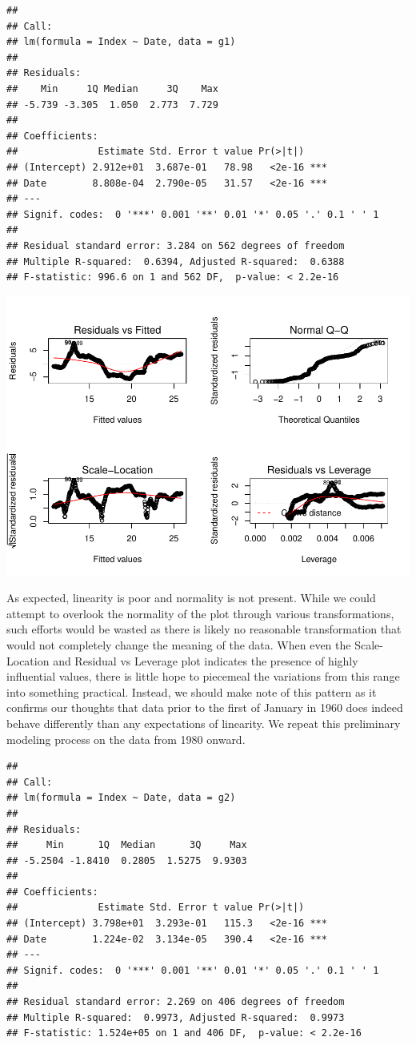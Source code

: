 \documentclass[
]{article}
\begin{document}
\begin{verbatim}
## 
## Call:
## lm(formula = Index ~ Date, data = g1)
## 
## Residuals:
##    Min     1Q Median     3Q    Max 
## -5.739 -3.305  1.050  2.773  7.729 
## 
## Coefficients:
##              Estimate Std. Error t value Pr(>|t|)    
## (Intercept) 2.912e+01  3.687e-01   78.98   <2e-16 ***
## Date        8.808e-04  2.790e-05   31.57   <2e-16 ***
## ---
## Signif. codes:  0 '***' 0.001 '**' 0.01 '*' 0.05 '.' 0.1 ' ' 1
## 
## Residual standard error: 3.284 on 562 degrees of freedom
## Multiple R-squared:  0.6394, Adjusted R-squared:  0.6388 
## F-statistic: 996.6 on 1 and 562 DF,  p-value: < 2.2e-16
\end{verbatim}

\includegraphics{CPIAnalysis_files/figure-latex/unnamed-chunk-7-1.pdf}

As expected, linearity is poor and normality is not present. While we
could attempt to overlook the normality of the plot through various
transformations, such efforts would be wasted as there is likely no
reasonable transformation that would not completely change the meaning
of the data. When even the Scale-Location and Residual vs Leverage plot
indicates the presence of highly influential values, there is little
hope to piecemeal the variations from this range into something
practical. Instead, we should make note of this pattern as it confirms
our thoughts that data prior to the first of January in 1960 does indeed
behave differently than any expectations of linearity. We repeat this
preliminary modeling process on the data from 1980 onward.

\begin{verbatim}
## 
## Call:
## lm(formula = Index ~ Date, data = g2)
## 
## Residuals:
##     Min      1Q  Median      3Q     Max 
## -5.2504 -1.8410  0.2805  1.5275  9.9303 
## 
## Coefficients:
##              Estimate Std. Error t value Pr(>|t|)    
## (Intercept) 3.798e+01  3.293e-01   115.3   <2e-16 ***
## Date        1.224e-02  3.134e-05   390.4   <2e-16 ***
## ---
## Signif. codes:  0 '***' 0.001 '**' 0.01 '*' 0.05 '.' 0.1 ' ' 1
## 
## Residual standard error: 2.269 on 406 degrees of freedom
## Multiple R-squared:  0.9973, Adjusted R-squared:  0.9973 
## F-statistic: 1.524e+05 on 1 and 406 DF,  p-value: < 2.2e-16
\end{verbatim}
\end{document}
